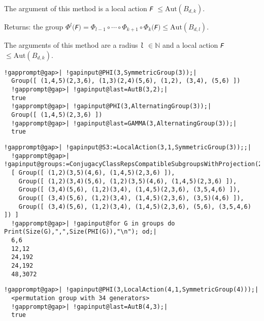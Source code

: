\documentclass[a4paper,11pt]{report}
\begin{document}
{{{\begin{description}
 The argument of this method is a local action \mbox{\texttt{\mdseries\slshape F}} $\le\mathrm{Aut}(B_{d,k})$. 
\item[{for the arguments \mbox{\texttt{\mdseries\slshape l}}, \mbox{\texttt{\mdseries\slshape d}}, \mbox{\texttt{\mdseries\slshape k}}, \mbox{\texttt{\mdseries\slshape F}}}]  Returns: the group $\Phi^{l}($\mbox{\texttt{\mdseries\slshape F}}$)=\Phi_{l-1}\circ\cdots\circ\Phi_{k+1}\circ\Phi_{k}($\mbox{\texttt{\mdseries\slshape F}}$)\le\mathrm{Aut}(B_{d,l})$. 

 The arguments of this method are a radius \mbox{\texttt{\mdseries\slshape l}} $\in\mathbb{N}$ and a local action \mbox{\texttt{\mdseries\slshape F}} $\le\mathrm{Aut}(B_{d,k})$. 
\end{description}
 

 }

 

 
\begin{Verbatim}[commandchars=!@|,fontsize=\small,frame=single,label=Example]
  !gapprompt@gap>| !gapinput@PHI(3,SymmetricGroup(3));|
  Group([ (1,4,5)(2,3,6), (1,3)(2,4)(5,6), (1,2), (3,4), (5,6) ])
  !gapprompt@gap>| !gapinput@last=AutB(3,2);|
  true
  !gapprompt@gap>| !gapinput@PHI(3,AlternatingGroup(3));|
  Group([ (1,4,5)(2,3,6) ])
  !gapprompt@gap>| !gapinput@last=GAMMA(3,AlternatingGroup(3));|
  true
\end{Verbatim}
 

 
\begin{Verbatim}[commandchars=!@|,fontsize=\small,frame=single,label=Example]
  !gapprompt@gap>| !gapinput@S3:=LocalAction(3,1,SymmetricGroup(3));;|
  !gapprompt@gap>| !gapinput@groups:=ConjugacyClassRepsCompatibleSubgroupsWithProjection(2,S3);|
  [ Group([ (1,2)(3,5)(4,6), (1,4,5)(2,3,6) ]), 
    Group([ (1,2)(3,4)(5,6), (1,2)(3,5)(4,6), (1,4,5)(2,3,6) ]), 
    Group([ (3,4)(5,6), (1,2)(3,4), (1,4,5)(2,3,6), (3,5,4,6) ]), 
    Group([ (3,4)(5,6), (1,2)(3,4), (1,4,5)(2,3,6), (3,5)(4,6) ]), 
    Group([ (3,4)(5,6), (1,2)(3,4), (1,4,5)(2,3,6), (5,6), (3,5,4,6) ]) ]
  !gapprompt@gap>| !gapinput@for G in groups do Print(Size(G),",",Size(PHI(G)),"\n"); od;|
  6,6
  12,12
  24,192
  24,192
  48,3072
\end{Verbatim}
 

 
\begin{Verbatim}[commandchars=!@|,fontsize=\small,frame=single,label=Example]
  !gapprompt@gap>| !gapinput@PHI(3,LocalAction(4,1,SymmetricGroup(4)));|
  <permutation group with 34 generators>
  !gapprompt@gap>| !gapinput@last=AutB(4,3);|
  true
\end{Verbatim}
 

}}
\end{document}

